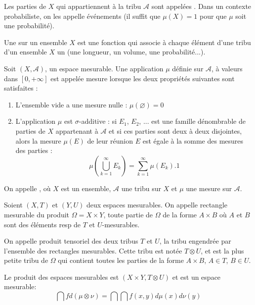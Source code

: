 Les parties de $X$ qui appartiennent à la tribu $\mathcal{A}$ sont appelées .
Dans un contexte probabiliste, on les appelle événements (il suffit que $\mu(X)=1$ pour que $\mu$ soit
une probabilité).

Une  sur un ensemble $X$ est une fonction qui
associe à chaque élément d'une tribu d'un ensemble $X$ un 
(une longueur, un volume, une probabilité...).

\begin{definition}[Mesure]
\medskip
Soit $(X,\mathcal{A})$, un espace mesurable.
Une application $\mu$ définie sur $\mathcal{A}$, à valeurs dans $[0,+\infty]$ est appelée
mesure lorsque les deux propriétés suivantes sont satisfaites :
\begin{enumerate}
   \item L'ensemble vide a une mesure nulle : $\mu\left(\varnothing\right)=0$
   \item L'application $\mu$ est $\sigma$-additive :
si $E_1$, $E_2$, ... est une famille dénombrable de parties de $X$ appartenant à
$\mathcal{A}$ et si ces parties sont deux à deux disjointes, alors la mesure $\mu(E)$ de leur réunion
$E$ est égale à la somme des mesures des parties :
\begin{equation}
\mu\left(\bigcup_{k=1}^{\infty}E_{k}\right)=\sum_{k=1}^{\infty}\mu(E_{k}).1
\end{equation}
\end{enumerate}
\end{definition}

On appelle ,
  où $X$ est un ensemble, $\mathcal{A}$ une tribu sur
$X$ et $\mu$ une mesure sur $\mathcal{A}$.

{}
Soient $(X,T)$ et $(Y,U)$ deux espaces mesurables.
On appelle rectangle mesurable du produit $\Omega=X\times Y$, toute partie de $\Omega$
de la forme $A\times B$ où $A$ et $B$ sont des éléments resp de $T$ et $U$-mesurables.

On appelle produit tensoriel des deux tribus $T$ et $U$, la tribu
engendrée par l'ensemble des rectangles mesurables.
Cette tribu est notée $T \otimes U$, et est la plus petite tribu de $\Omega$ qui contient
toutes les parties de la forme $A\times B$, $A\in T$, $B\in U$.

Le produit des espaces mesurables est $(X\times Y, T \otimes U)$ et est un espace mesurable:
\begin{equation}
\dint fd(\mu \otimes \nu) = \dint\dint f(x,y) d\mu(x)d\nu(y)
\end{equation}


